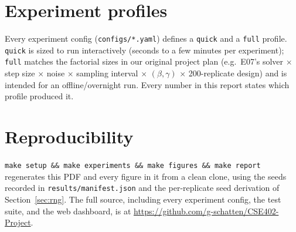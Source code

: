 \section{Experiment profiles}
\label{sec:appendix-profiles}
Every experiment config (\texttt{configs/*.yaml}) defines a \texttt{quick} and a \texttt{full}
profile. \texttt{quick} is sized to run interactively (seconds to a few minutes per experiment);
\texttt{full} matches the factorial sizes in our original project plan (e.g.\ E07's solver
$\times$ step size $\times$ noise $\times$ sampling interval $\times$ $(\beta,\gamma)$ $\times$
200-replicate design) and is intended for an offline/overnight run. Every number in this report
states which profile produced it.

\section{Reproducibility}
\texttt{make setup \&\& make experiments \&\& make figures \&\& make report} regenerates this PDF
and every figure in it from a clean clone, using the seeds recorded in \texttt{results/manifest.json}
and the per-replicate seed derivation of Section~\ref{sec:rng}. The full source, including every
experiment config, the test suite, and the web dashboard, is at
\url{https://github.com/g-schatten/CSE402-Project}.

